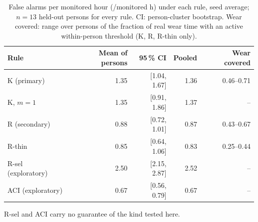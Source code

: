 \begin{table}[htbp]
\centering
\footnotesize
\caption{False alarms per monitored hour (/monitored h) under each rule, seed average; $n = 13$ held-out persons for every rule. CI: person-cluster bootstrap. Wear covered: range over persons of the fraction of real wear time with an active within-person threshold (K, R, R-thin only).}\label{tab:far}
\begin{tabular}{lrrrr}
\toprule
Rule & Mean of persons & 95\,\% CI & Pooled & Wear covered \\
\midrule
K (primary) & 1.35 & [1.04, 1.67] & 1.36 & 0.46--0.71 \\
K, $m=1$ & 1.35 & [0.91, 1.86] & 1.37 & -- \\
R (secondary) & 0.88 & [0.72, 1.01] & 0.87 & 0.43--0.67 \\
R-thin & 0.85 & [0.64, 1.06] & 0.83 & 0.25--0.44 \\
R-sel (exploratory) & 2.50 & [2.15, 2.87] & 2.52 & -- \\
ACI (exploratory) & 0.67 & [0.56, 0.79] & 0.67 & -- \\
\bottomrule
\end{tabular}
\par\smallskip\begin{minipage}{0.95\linewidth}\scriptsize {} R-sel and ACI carry no guarantee of the kind tested here.\end{minipage}
\end{table}
